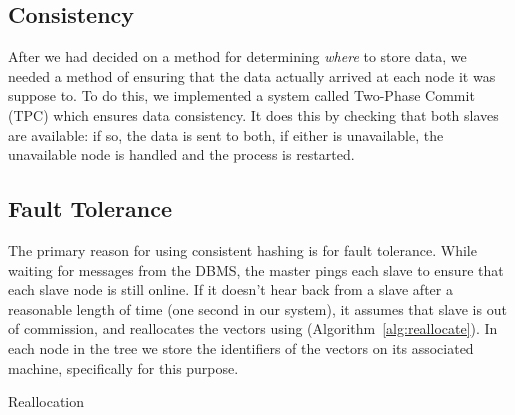 \subsection{Consistency}
After we had decided on a method for determining \emph{where} to store data,
we needed a method of ensuring that the data actually arrived at each node it
was suppose to. To do this, we implemented a system called Two-Phase Commit
(TPC) which ensures data consistency. It does this by checking that both slaves
are available: if so, the data is sent to both, if either is unavailable, the
unavailable node is handled and the process is restarted.
%
\subsection{Fault Tolerance}
The primary reason for using consistent hashing is for fault tolerance. While
waiting for messages from the DBMS, the master pings each slave to ensure that
each slave node is still online. If it doesn't hear back from a slave after a
reasonable length of time (one second in our system), it assumes that slave is
out of commission, and reallocates the vectors using 
(Algorithm~\ref{alg:reallocate}). In each node in the tree we store the identifiers of
the vectors on its associated machine, specifically for this purpose.
%
\begin{algorithm}
    \begin{algorithmic}
            \EndFor
            \EndFor
        \EndProcedure
    \end{algorithmic}
    \caption{Reallocation}
    \label{alg:reallocate}
\end{algorithm}
%
